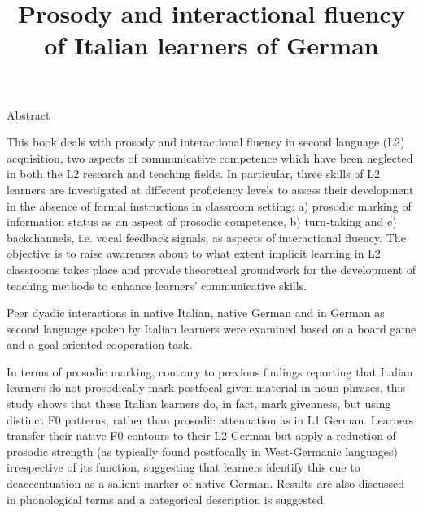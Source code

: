 
\title{Prosody and interactional fluency of Italian learners of German}
\maketitle

\begin{stylelsAbstract}
Abstract
\end{stylelsAbstract}

\begin{stylelsAbstract}
This book deals with prosody and interactional fluency in second language (L2) acquisition, two aspects of communicative competence which have been neglected in both the L2 research and teaching fields. In particular, three skills of L2 learners are investigated at different proficiency levels to assess their development in the absence of formal instructions in classroom setting: a) prosodic marking of information status as an aspect of prosodic competence, b) turn-taking and c) backchannels, i.e. vocal feedback signals, as aspects of interactional fluency. The objective is to raise awareness about to what extent implicit learning in L2 classrooms takes place and provide theoretical groundwork for the development of teaching methods to enhance learners’ communicative skills.
\end{stylelsAbstract}

\begin{stylelsAbstract}
Peer dyadic interactions in native Italian, native German and in German as second language spoken by Italian learners were examined based on a board game and a goal-oriented cooperation task.
\end{stylelsAbstract}

\begin{stylelsAbstract}
In terms of prosodic marking, contrary to previous findings reporting that Italian learners do not prosodically mark postfocal given material in noun phrases, this study shows that these Italian learners do, in fact, mark givenness, but using distinct F0 patterns, rather than prosodic attenuation as in L1 German. Learners transfer their native F0 contours to their L2 German but apply a reduction of prosodic strength (as typically found postfocally in West-Germanic languages) irrespective of its function, suggesting that learners identify this cue to deaccentuation as a salient marker of native German. Results are also discussed in phonological terms and a categorical description is suggested.
\end{stylelsAbstract}

